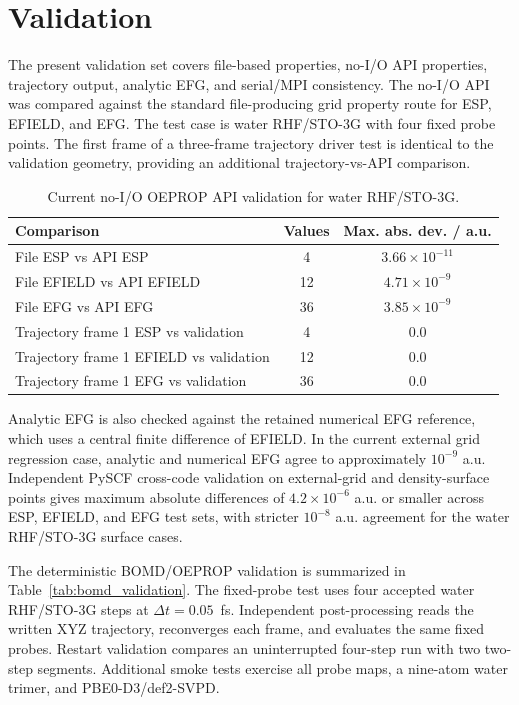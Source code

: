 \documentclass[journal=jctcce,manuscript=article,email=false]{achemso}
\begin{document}
\section{Validation}

The present validation set covers file-based properties, no-I/O API
properties, trajectory output, analytic EFG, and serial/MPI consistency.
The no-I/O API was compared against the standard file-producing grid
property route for ESP, EFIELD, and EFG.  The test case is water
RHF/STO-3G with four fixed probe points.  The first frame of a three-frame
trajectory driver test is identical to the validation geometry, providing
an additional trajectory-vs-API comparison.

\begin{table}[htbp]
\centering
\caption{Current no-I/O OEPROP API validation for water RHF/STO-3G.}
\begin{tabular}{lcc}
\toprule
Comparison & Values & Max. abs. dev. / a.u. \\
\midrule
File ESP vs API ESP & 4 & \(3.66\times10^{-11}\) \\
File EFIELD vs API EFIELD & 12 & \(4.71\times10^{-9}\) \\
File EFG vs API EFG & 36 & \(3.85\times10^{-9}\) \\
Trajectory frame 1 ESP vs validation & 4 & \(0.0\) \\
Trajectory frame 1 EFIELD vs validation & 12 & \(0.0\) \\
Trajectory frame 1 EFG vs validation & 36 & \(0.0\) \\
\bottomrule
\end{tabular}
\label{tab:api_validation}
\end{table}

Analytic EFG is also checked against the retained numerical EFG reference,
which uses a central finite difference of EFIELD.  In the current external
grid regression case, analytic and numerical EFG agree to approximately
\(10^{-9}\) a.u.  Independent PySCF cross-code validation on external-grid
and density-surface points gives maximum absolute differences of
\(4.2\times10^{-6}\) a.u. or smaller across ESP, EFIELD, and EFG test
sets, with stricter \(10^{-8}\) a.u. agreement for the
water RHF/STO-3G surface cases.

The deterministic BOMD/OEPROP validation is summarized in
Table~\ref{tab:bomd_validation}.  The fixed-probe test uses four accepted
water RHF/STO-3G steps at \(\Delta t=0.05\)~fs.  Independent
post-processing reads the written XYZ trajectory, reconverges each frame,
and evaluates the same fixed probes.  Restart validation compares an
uninterrupted four-step run with two two-step segments.  Additional smoke
tests exercise all probe maps, a nine-atom water trimer, and
PBE0-D3/def2-SVPD.
\end{document}
